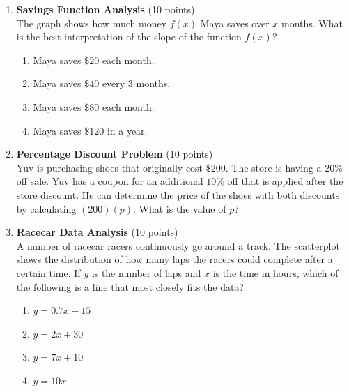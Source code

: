 \begin{enumerate}
  \item \textbf{Savings Function Analysis} (10 points)\\
  The graph shows how much money $f(x)$ Maya saves over $x$ months. What is the best interpretation of the slope of the function $f(x)$?
  \begin{enumerate}[label=(\Alph*)]
    \item Maya saves $\$20$ each month.
    \item Maya saves $\$40$ every 3 months.
    \item Maya saves $\$80$ each month.
    \item Maya saves $\$120$ in a year.
  \end{enumerate}
  \begin{subanswer}
  \end{subanswer}


  \newpage

  \item \textbf{Percentage Discount Problem} (10 points)\\
  Yuv is purchasing shoes that originally cost $\$200$. The store is having a $20\%$ off sale. Yuv has a coupon for an additional $10\%$ off that is applied after the store discount. He can determine the price of the shoes with both discounts by calculating $(200)(p)$. What is the value of $p$?
  \begin{subanswer}
  \end{subanswer}

  \item \textbf{Racecar Data Analysis} (10 points)\\
  A number of racecar racers continuously go around a track. The scatterplot shows the distribution of how many laps the racers could complete after a certain time. If $y$ is the number of laps and $x$ is the time in hours, which of the following is a line that most closely fits the data?
  \begin{enumerate}[label=(\Alph*)]
    \item $y=0.7 x+15$
    \item $y=2 x+30$
    \item $y=7 x+10$
    \item $y=10 x$
  \end{enumerate}
  \begin{subanswer}
  \end{subanswer}



\end{enumerate}
